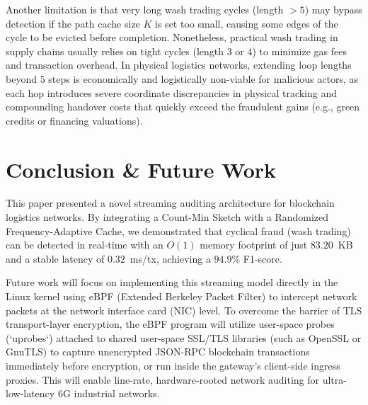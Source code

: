 \documentclass[conference]{IEEEtran}
\begin{document}
Another limitation is that very long wash trading cycles (length $>5$) may bypass detection if the path cache size $K$ is set too small, causing some edges of the cycle to be evicted before completion. Nonetheless, practical wash trading in supply chains usually relies on tight cycles (length $3$ or $4$) to minimize gas fees and transaction overhead. In physical logistics networks, extending loop lengths beyond $5$ steps is economically and logistically non-viable for malicious actors, as each hop introduces severe coordinate discrepancies in physical tracking and compounding handover costs that quickly exceed the fraudulent gains (e.g., green credits or financing valuations).

\section{Conclusion \& Future Work}
This paper presented a novel streaming auditing architecture for blockchain logistics networks. By integrating a Count-Min Sketch with a Randomized Frequency-Adaptive Cache, we demonstrated that cyclical fraud (wash trading) can be detected in real-time with an $O(1)$ memory footprint of just $83.20$~KB and a stable latency of $0.32$~ms/tx, achieving a $94.9\%$ F1-score. 

Future work will focus on implementing this streaming model directly in the Linux kernel using eBPF (Extended Berkeley Packet Filter) \cite{b6} to intercept network packets at the network interface card (NIC) level. To overcome the barrier of TLS transport-layer encryption, the eBPF program will utilize user-space probes (`uprobes`) attached to shared user-space SSL/TLS libraries (such as OpenSSL or GnuTLS) to capture unencrypted JSON-RPC blockchain transactions immediately before encryption, or run inside the gateway's client-side ingress proxies. This will enable line-rate, hardware-rooted network auditing for ultra-low-latency 6G industrial networks.
\end{document}
